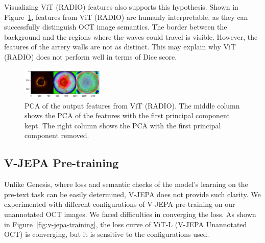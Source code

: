 \documentclass[a4paper,11pt,oneside]{report}
\begin{document}
Visualizing ViT (RADIO) features also supports this hypothesis. Shown in Figure~\ref{fig:radio-features}, features from ViT (RADIO) are humanly interpretable, as they can successfully distinguish OCT image semantics. The border between the background and the regions where the waves could travel is visible. However, the features of the artery walls are not as distinct. This may explain why ViT (RADIO) does not perform well in terms of Dice score.

\begin{figure}[hbt]
    \centering
    \includegraphics[width=0.35\textwidth]{figures/discussion_radio_feature.png}
    \caption{PCA of the output features from ViT (RADIO). The middle column shows the PCA of the features with the first principal component kept. The right column shows the PCA with the first principal component removed.}
    \label{fig:radio-features}
\end{figure}

\subsection{V-JEPA Pre-training}
Unlike Genesis, where loss and semantic checks of the model's learning on the pre-text task can be easily determined, V-JEPA does not provide such clarity. We experimented with different configurations of V-JEPA pre-training on our unannotated OCT images. We faced difficulties in converging the loss. As shown in Figure~\ref{fig:v-jepa-training}, the loss curve of ViT-L (V-JEPA Unannotated OCT) is converging, but it is sensitive to the configurations used.
\end{document}
